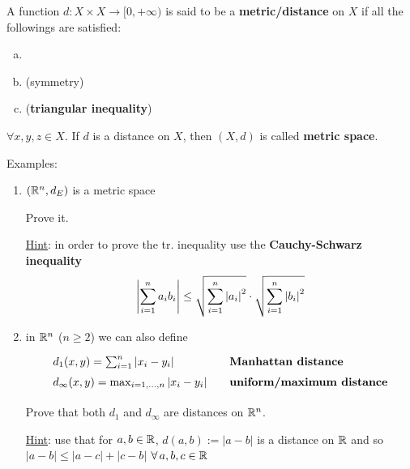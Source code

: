 \begin{defn}
A function $d:X\times X\to[0,+\infty)$ is said to be a \textbf{metric/distance} on $X$ if all the followings are satisfied:
\begin{enumerate}[(a)]
    \item {}
    \item { (symmetry)}
    \item { (\textbf{triangular inequality})}
\end{enumerate}
$\forall x,y,z\in X$. If $d$ is a distance on $X$, then $(X,d)$ is called \textbf{metric space}.
\end{defn}

Examples:
\begin{enumerate}
    \item $\left( \mathbb{R}^n,d_E \right)$ is a metric space

    \begin{home}
    Prove it.

    \underline{Hint}: in order to prove the tr. inequality use the \textbf{Cauchy-Schwarz inequality}
    \begin{equation*}
        \left\lvert \sum^{n}_{i=1}a_ib_i \right\rvert\leq\sqrt{\sum^{n}_{i=1}\left\lvert a_i \right\rvert^2 } \cdot \sqrt{\sum^{n}_{i=1}\left\lvert b_i \right\rvert^2 }
    \end{equation*}
    \newline
    \newline
    \end{home}

    \item in $\mathbb{R}^n$ ($n\geq 2$) we can also define
    \begin{equation*}
    {\renewcommand*{\arraystretch}{1.5}
    \begin{array}{ll}
    d_1(x,y)=\sum^{n}_{i=1}\abs{x_i-y_i} &\quad\textbf{Manhattan distance} \\
    d_\infty(x,y)=\max_{i=1,...,n} \abs{x_i-y_i} &\quad\textbf{uniform/maximum distance} 
    \end{array}}
    \end{equation*}

    \begin{home}
    Prove that both $d_1$ and $d_\infty$ are distances on $\mathbb{R}^n$.

    \underline{Hint}: use that for $a,b\in\mathbb{R}$, $d(a,b):=|a-b|$ is a distance on $\mathbb{R}$ and so $|a-b|\leq|a-c|+|c-b|$ $\forall a,b,c\in\RR$
    \newline
    \newline
    \end{home}


\end{enumerate}

